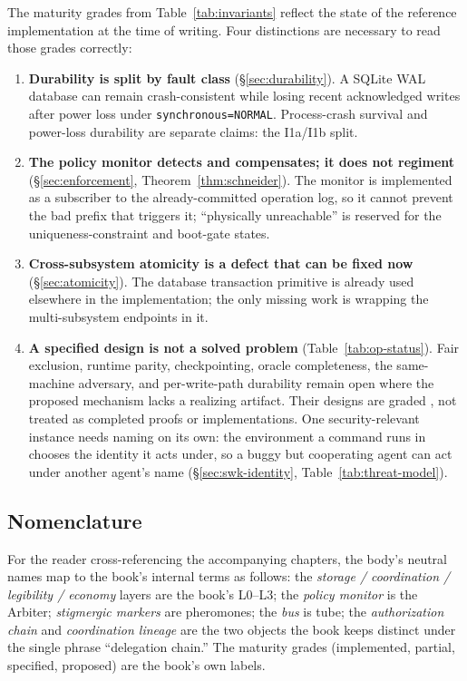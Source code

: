 \documentclass[11pt,a4paper]{article}
\theoremstyle{definition}
\theoremstyle{remark}
\begin{document}
The maturity grades from Table~\ref{tab:invariants} reflect the state of the
reference implementation at the time of writing. Four distinctions are necessary
to read those grades correctly:

\begin{enumerate}[leftmargin=1.6em]
\item \textbf{Durability is split by fault class} (\S\ref{sec:durability}). A
SQLite WAL database can remain crash-consistent while losing recent acknowledged
writes after power loss under \texttt{synchronous=NORMAL}. Process-crash survival
and power-loss durability are separate claims: the I1a/I1b split.
\item \textbf{The policy monitor detects and compensates; it does not regiment}
(\S\ref{sec:enforcement}, Theorem~\ref{thm:schneider}). The monitor is implemented
as a subscriber to the already-committed operation log, so it cannot prevent the
bad prefix that triggers it; ``physically unreachable'' is reserved for the
uniqueness-constraint and boot-gate states.
\item \textbf{Cross-subsystem atomicity is a defect that can be fixed now}
(\S\ref{sec:atomicity}). The database transaction primitive is already used
elsewhere in the implementation; the only missing work is wrapping the multi-subsystem
endpoints in it.
\item \textbf{A specified design is not a solved problem}
(Table~\ref{tab:op-status}). Fair exclusion, runtime parity, checkpointing, oracle
completeness, the same-machine adversary, and per-write-path durability remain
open where the proposed mechanism lacks a realizing artifact. Their designs are
graded \Designed{}, not treated as completed proofs or implementations. One
security-relevant instance needs naming on its own: the environment a command
runs in chooses the identity it acts under, so a buggy but cooperating agent can
act under another agent's name (\S\ref{sec:swk-identity},
Table~\ref{tab:threat-model}).
\end{enumerate}

\subsection{Nomenclature}

For the reader cross-referencing the accompanying chapters, the body's neutral names map
to the book's internal terms as follows: the \emph{storage / coordination /
legibility / economy} layers are the book's L0--L3; the \emph{policy monitor} is
the Arbiter; \emph{stigmergic markers} are pheromones; the \emph{bus} is tube; the
\emph{authorization chain} and \emph{coordination lineage} are the two objects the
book keeps distinct under the single phrase ``delegation chain.'' The maturity
grades (implemented, partial, specified, proposed) are the book's own labels.
\end{document}
